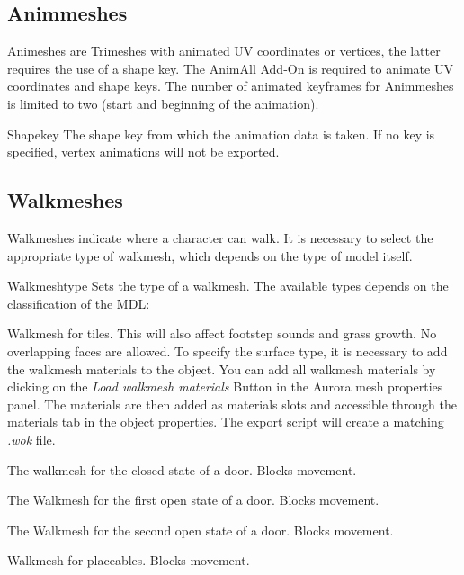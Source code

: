 \subsection{Animmeshes}
Animeshes are Trimeshes with animated UV coordinates or vertices, the latter requires the use of a 
shape key. The AnimAll Add-On is required to animate UV coordinates and shape keys. The number of 
animated keyframes for Animmeshes is limited to two (start and beginning of the animation).

\begin{propertyAurora}{Shapekey} 
    The shape key from which the animation data is taken. If no key is specified, vertex animations will
    not be exported.
\end{propertyAurora}

\subsection{Walkmeshes}
Walkmeshes indicate where a character can walk. It is necessary to select 
the appropriate type of walkmesh, which depends on the type of model itself. 

\begin{propertyAurora}{Walkmeshtype} 
Sets the type of a walkmesh. The available types depends on the classification of the MDL:
\begin{description}[leftmargin=10em,style=nextline]
    \item[Tileset] Walkmesh for tiles. This will also affect footstep sounds and grass growth. No overlapping faces are allowed. To specify the surface type, it is necessary to add the walkmesh materials to the object. You can add all walkmesh materials by clicking on the {\textit{Load walkmesh materials}} Button in the Aurora mesh properties panel. The materials are then added as materials slots and accessible through the materials tab in the object properties.
    The export script will create a matching {\textit{.wok}} file. 
    \item[Door: Closed] The walkmesh for the closed state of a door. Blocks movement.
    \item[Door: Open 1] The Walkmesh for the first open state of a door. Blocks movement.
    \item[Door: Open 2] The Walkmesh for the second open state of a door. Blocks movement.
    \item[Placeable] Walkmesh for placeables. Blocks movement.
\end{description}
\end{propertyAurora}

